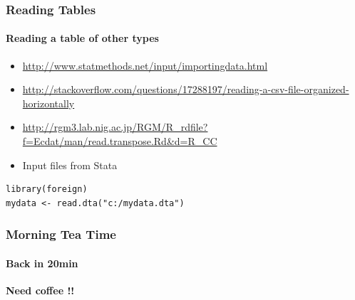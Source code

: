 \documentclass[10pt,handout,english]{beamer}\usepackage[]{graphicx}\usepackage[]{color}
\begin{document}
\begin{frame}[fragile]
  \frametitle{Reading Tables}
  \framesubtitle{Reading a table of other types}
\begin{itemize}  
\item \url{http://www.statmethods.net/input/importingdata.html}
\item \url{http://stackoverflow.com/questions/17288197/reading-a-csv-file-organized-horizontally}
\item \url{http://rgm3.lab.nig.ac.jp/RGM/R_rdfile?f=Ecdat/man/read.transpose.Rd&d=R_CC}
\item Input files from Stata
\end{itemize}
\begin{lstlisting} 
library(foreign)
mydata <- read.dta("c:/mydata.dta")  
\end{lstlisting} 
\end{frame}

\begin{frame}
  \frametitle{Morning Tea Time}
  \framesubtitle{Back in 20min}
  {\bf Need coffee !!} 
\end{frame}

\end{document}
